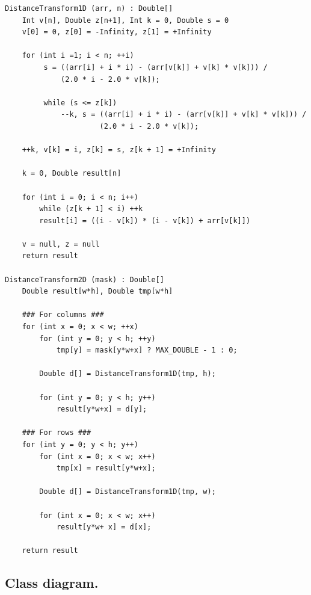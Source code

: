 \documentclass[a4paper,11pt,oneside]{article}
\begin{document}
\begin{verbatim}
DistanceTransform1D (arr, n) : Double[]
    Int v[n], Double z[n+1], Int k = 0, Double s = 0
    v[0] = 0, z[0] = -Infinity, z[1] = +Infinity

    for (int i =1; i < n; ++i)
         s = ((arr[i] + i * i) - (arr[v[k]] + v[k] * v[k])) / 
             (2.0 * i - 2.0 * v[k]);

         while (s <= z[k])
             --k, s = ((arr[i] + i * i) - (arr[v[k]] + v[k] * v[k])) / 
                      (2.0 * i - 2.0 * v[k]);

    ++k, v[k] = i, z[k] = s, z[k + 1] = +Infinity

    k = 0, Double result[n]

    for (int i = 0; i < n; i++)
        while (z[k + 1] < i) ++k
        result[i] = ((i - v[k]) * (i - v[k]) + arr[v[k]])

    v = null, z = null
    return result

DistanceTransform2D (mask) : Double[]
    Double result[w*h], Double tmp[w*h]

    ### For columns ###
    for (int x = 0; x < w; ++x)
        for (int y = 0; y < h; ++y)
            tmp[y] = mask[y*w+x] ? MAX_DOUBLE - 1 : 0;

        Double d[] = DistanceTransform1D(tmp, h);

        for (int y = 0; y < h; y++)
            result[y*w+x] = d[y];

    ### For rows ###
    for (int y = 0; y < h; y++)
        for (int x = 0; x < w; x++)
            tmp[x] = result[y*w+x];

        Double d[] = DistanceTransform1D(tmp, w);

        for (int x = 0; x < w; x++)
            result[y*w+ x] = d[x];

    return result
\end{verbatim}

\newpage
\subsection{Class diagram.}
\end{document}
